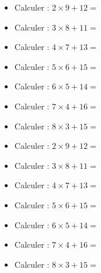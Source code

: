 



\begin{multicols}{3}

\begin{itemize}[label={$\bullet$}]
  \item Calculer :  $ 2 \times 9 + 12 = $ \dotfill \\
  \item Calculer :  $ 3 \times 8 + 11 = $ \dotfill \\
  \item Calculer :  $ 4 \times 7 + 13 = $ \dotfill \\
  \item Calculer :  $ 5 \times 6 + 15 = $ \dotfill \\
  \item Calculer :  $ 6 \times 5 + 14 = $ \dotfill \\
  \item Calculer :  $ 7 \times 4 + 16 = $ \dotfill \\
  \item Calculer :  $ 8 \times 3+  15 = $ \dotfill \\ 
\end{itemize}


\begin{itemize}[label={$\bullet$}]
  \item Calculer :  $ 2 \times 9 + 12 = $ \dotfill \\
  \item Calculer :  $ 3 \times 8 + 11 = $ \dotfill \\
  \item Calculer :  $ 4 \times 7 + 13 = $ \dotfill \\
  \item Calculer :  $ 5 \times 6 + 15 = $ \dotfill \\
  \item Calculer :  $ 6 \times 5 + 14 = $ \dotfill \\
  \item Calculer :  $ 7 \times 4 + 16 = $ \dotfill \\
  \item Calculer :  $ 8 \times 3+  15 = $ \dotfill \\ 
\end{itemize}



\end{multicols}

